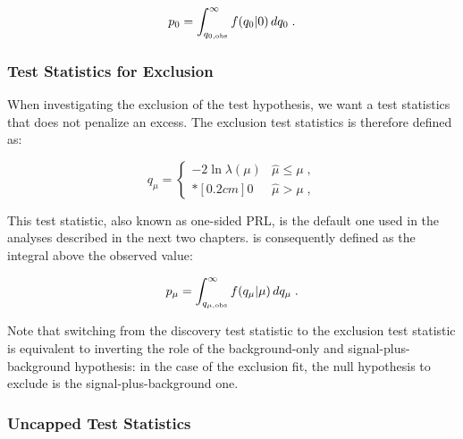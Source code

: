 \begin{equation}
\label{eq:stat:p0}
p_{0} = \int_{q_{0,{\rm obs}}}^{\infty} f(q_{0} | 0 ) \, d q_{0} \;.
\end{equation}

\subsubsection*{Test Statistics for Exclusion}

When investigating the exclusion of the test hypothesis, we want a test statistics that does not penalize an excess. The exclusion test statistics \qmu is therefore defined as:

\begin{equation}
\label{eq:stat:qmu}
q_{\mu} =
\left\{ \! \! \begin{array}{ll}
               - 2 \ln \lambda(\mu)  & \hat{\mu} \le \mu  \;, \\*[0.2 cm]
               0 & \hat{\mu} > \mu \;,
              \end{array}
       \right.
\end{equation}

\noindent This test statistic, also known as one-sided PRL, is the default one used in the analyses described in the next two chapters. \pmu is consequently defined as the integral above the observed value: 

\begin{equation}
\label{eq:stat:pmu}
p_{\mu} = \int_{q_{\mu,{\rm obs}}}^{\infty} f(q_{\mu} | \mu ) \, d q_{\mu} \;.
\end{equation}

\noindent Note that switching from the discovery test statistic to the exclusion test statistic is equivalent to inverting the role of the background-only and signal-plus-background hypothesis: in the case of the exclusion fit, the null hypothesis to exclude is the signal-plus-background one.


\subsubsection*{Uncapped Test Statistics}

